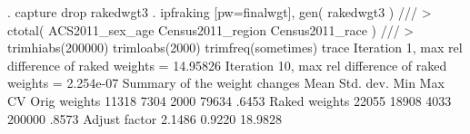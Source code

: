 . capture drop rakedwgt3
{\smallskip}
. ipfraking [pw=finalwgt], gen( rakedwgt3 ) ///
>     ctotal( ACS2011_sex_age Census2011_region Census2011_race ) ///
>     trimhiabs(200000) trimloabs(2000) trimfreq(sometimes) trace
{\smallskip}
 Iteration 1, max rel difference of raked weights = 14.95826
\oom
 Iteration 10, max rel difference of raked weights = 2.254e-07
{\smallskip}
   Summary of the weight changes
{\smallskip}
              {\VBAR}    Mean    Std. dev.    Min        Max       CV
Orig weights  {\VBAR}    11318       7304      2000       79634   .6453
Raked weights {\VBAR}    22055      18908      4033      200000   .8573
Adjust factor {\VBAR}   2.1486               0.9220     18.9828
{\smallskip}
